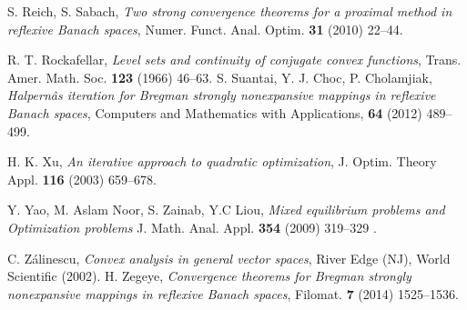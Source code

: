 \documentclass[reqno,b5paper]{amsart}
\theoremstyle{plain}
\theoremstyle{definition}
\numberwithin{equation}{section}
\numberwithin{equation}{section}
\begin{document}
\begin{thebibliography}{99}
S. Reich, S. Sabach, \textit{Two strong convergence theorems for a proximal method in reflexive Banach spaces}, Numer. Funct. Anal.
Optim. \textbf{31} (2010) 22--44.

R. T. Rockafellar, \textit{Level sets and continuity of conjugate convex functions}, Trans. Amer. Math.
Soc. \textbf{123} (1966) 46--63.
S. Suantai, Y. J. Choc, P. Cholamjiak, \textit{ Halpernâs iteration for Bregman strongly nonexpansive mappings in reflexive Banach spaces},
Computers and Mathematics with Applications, \textbf{64} (2012) 489--499.

H. K. Xu, \textit{An iterative approach to quadratic optimization}, J. Optim. Theory Appl. \textbf{116} (2003) 659--678.

Y. Yao, M. Aslam Noor, S. Zainab, Y.C Liou, \textit{Mixed equilibrium problems and Optimization problems}
J. Math. Anal. Appl. \textbf{354} (2009) 319--329 .

C. Z\'{a}linescu,  \textit{Convex analysis in general vector spaces}, River Edge (NJ), World Scientific (2002).
H. Zegeye, \textit{Convergence theorems for Bregman strongly nonexpansive
mappings in reflexive Banach spaces}, Filomat. \textbf{7} (2014) 1525--1536.
\end{thebibliography}
\end{document}
